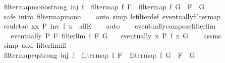 \begin{isabellebody}
%
\isadelimproof
\isanewline
%
\endisadelimproof
\isanewline
{}\isamarkupfalse%
\ filtermap{\isacharunderscore}{\kern0pt}mono{\isacharunderscore}{\kern0pt}strong{\isacharcolon}{\kern0pt}\ {\isachardoublequoteopen}inj\ f\ {\isasymLongrightarrow}\ filtermap\ f\ F\ {\isasymle}\ filtermap\ f\ G\ {\isasymlongleftrightarrow}\ F\ {\isasymle}\ G{\isachardoublequoteclose}\isanewline
%
\isadelimproof
\ \ %
\endisadelimproof
%
\isatagproof
{}\isamarkupfalse%
\ {\isacharparenleft}{\kern0pt}safe\ intro{\isacharbang}{\kern0pt}{\isacharcolon}{\kern0pt}\ filtermap{\isacharunderscore}{\kern0pt}mono{\isacharparenright}{\kern0pt}\isanewline
\ \ \isamarkupfalse%
\ {\isacharparenleft}{\kern0pt}auto\ simp{\isacharcolon}{\kern0pt}\ le{\isacharunderscore}{\kern0pt}filter{\isacharunderscore}{\kern0pt}def\ eventually{\isacharunderscore}{\kern0pt}filtermap{\isacharparenright}{\kern0pt}\isanewline
\ \ \isamarkupfalse%
\ {\isacharparenleft}{\kern0pt}erule{\isacharunderscore}{\kern0pt}tac\ x{\isacharequal}{\kern0pt}{\isachardoublequoteopen}{\isasymlambda}x{\isachardot}{\kern0pt}\ P\ {\isacharparenleft}{\kern0pt}inv\ f\ x{\isacharparenright}{\kern0pt}{\isachardoublequoteclose}\ \ allE{\isacharparenright}{\kern0pt}\isanewline
\ \ \isamarkupfalse%
\ auto\isanewline
\ \ \isamarkupfalse%
%
\endisatagproof
{\isafoldproof}%
%
\isadelimproof
\isanewline
%
\endisadelimproof
\isanewline
{}\isamarkupfalse%
\ eventually{\isacharunderscore}{\kern0pt}compose{\isacharunderscore}{\kern0pt}filterlim{\isacharcolon}{\kern0pt}\isanewline
\ \ \ {\isachardoublequoteopen}eventually\ P\ F{\isachardoublequoteclose}\ {\isachardoublequoteopen}filterlim\ f\ F\ G{\isachardoublequoteclose}\isanewline
\ \ \ {\isachardoublequoteopen}eventually\ {\isacharparenleft}{\kern0pt}{\isasymlambda}x{\isachardot}{\kern0pt}\ P\ {\isacharparenleft}{\kern0pt}f\ x{\isacharparenright}{\kern0pt}{\isacharparenright}{\kern0pt}\ G{\isachardoublequoteclose}\isanewline
%
\isadelimproof
\ \ %
\endisadelimproof
%
\isatagproof
{}\isamarkupfalse%
\ assms\ \isamarkupfalse%
\ {\isacharparenleft}{\kern0pt}simp\ add{\isacharcolon}{\kern0pt}\ filterlim{\isacharunderscore}{\kern0pt}iff{\isacharparenright}{\kern0pt}%
\endisatagproof
{\isafoldproof}%
%
\isadelimproof
\isanewline
%
\endisadelimproof
\isanewline
{}\isamarkupfalse%
\ filtermap{\isacharunderscore}{\kern0pt}eq{\isacharunderscore}{\kern0pt}strong{\isacharcolon}{\kern0pt}\ {\isachardoublequoteopen}inj\ f\ {\isasymLongrightarrow}\ filtermap\ f\ F\ {\isacharequal}{\kern0pt}\ filtermap\ f\ G\ {\isasymlongleftrightarrow}\ F\ {\isacharequal}{\kern0pt}\ G{\isachardoublequoteclose}\isanewline

\end{isabellebody}

